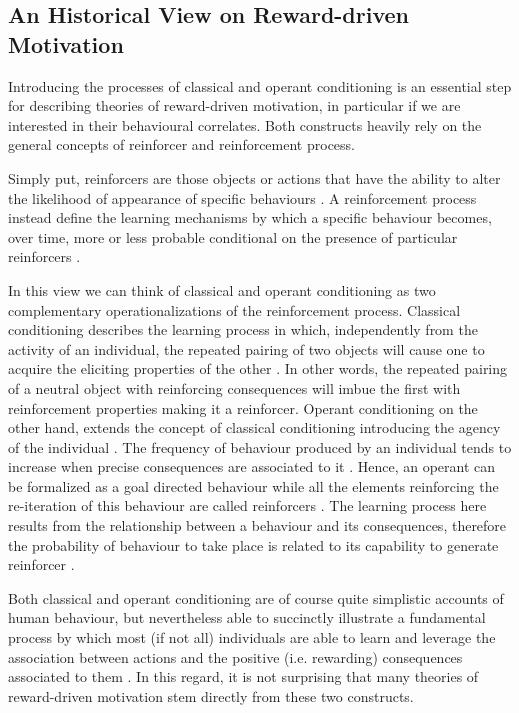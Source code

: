 \subsection{An Historical View on Reward-driven Motivation}
\label{motivation_hist}
Introducing the processes of classical and operant conditioning is an essential step for describing theories of reward-driven motivation, in particular if we are interested in their behavioural correlates. Both constructs heavily rely on the general concepts of reinforcer and reinforcement process. 

Simply put, reinforcers are those objects or actions that have the ability to alter the likelihood of appearance of specific behaviours \cite{kling1971woodworth,skinner1953science,squire2012fundamental}. A reinforcement process instead define the learning mechanisms by which a specific behaviour becomes, over time, more or less probable conditional on the presence of particular reinforcers \cite{kling1971woodworth}. 

In this view we can think of classical and operant conditioning as two complementary operationalizations of the reinforcement process. 
Classical conditioning describes the learning process in which, independently from the activity of an individual, the repeated pairing of two objects will cause one to acquire the eliciting properties of the other \cite{squire2012fundamental}. In other words, the repeated pairing of a neutral object with reinforcing consequences will imbue the first with reinforcement properties making it a reinforcer. 
Operant conditioning on the other hand, extends the concept of classical conditioning introducing the agency of the individual \cite{skinner1953science}. The frequency of behaviour produced by an individual tends to increase when precise consequences are associated to it \cite{skinner1953science}. Hence, an operant can be formalized as a goal directed behaviour while all the elements reinforcing the re-iteration of this behaviour are called reinforcers \cite{skinner1953science}. The learning process here results from the relationship between a behaviour and its consequences, therefore the probability of behaviour to take place is related to its capability to generate reinforcer \cite{kling1971woodworth}. 

Both classical and operant conditioning are of course quite simplistic accounts of human behaviour, but nevertheless able to succinctly illustrate a fundamental process by which most (if not all) individuals are able to learn and leverage the association between actions and the positive (i.e. rewarding) consequences associated to them \cite{schultz1997neural,simpson2016behavioral}. In this regard, it is not surprising that many theories of reward-driven motivation stem directly from these two constructs. 

